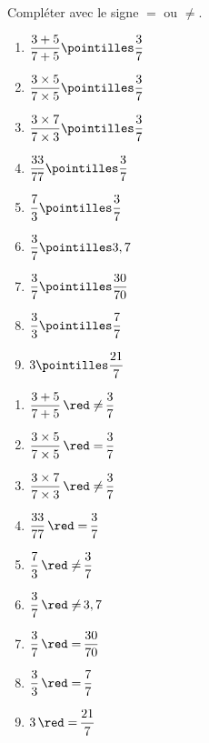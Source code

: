 \begin{exercice*}
   Compléter avec le signe $=$ ou $\neq$. \medskip
   \begin{multicols}{3}
      \begin{enumerate}
         \item $\dfrac{3+5}{7+5} \pointilles \dfrac{3}{7}$ \bigskip
         \item $\dfrac{3\times5}{7\times5} \pointilles \dfrac{3}{7}$ \bigskip
         \item $\dfrac{3\times7}{7\times3} \pointilles \dfrac{3}{7}$ \medskip
         \item $\dfrac{33}{77} \pointilles \dfrac{3}{7}$
         \item $\dfrac{7}{3} \pointilles \dfrac{3}{7}$
         \item $\dfrac{3}{7} \pointilles 3,7$
         \item $\dfrac{3}{7} \pointilles \dfrac{30}{70}$
         \item $\dfrac{3}{3} \pointilles \dfrac{7}{7}$
         \item $3 \pointilles \dfrac{21}{7}$
      \end{enumerate}
   \end{multicols}
\end{exercice*}

\begin{corrige}
   \begin{multicols}{3}
      \begin{enumerate}
         \item $\dfrac{3+5}{7+5} \, {\red \neq} \, \dfrac{3}{7}$ \medskip
         \item $\dfrac{3\times5}{7\times5} \, {\red =} \, \dfrac{3}{7}$ \medskip
         \item $\dfrac{3\times7}{7\times3} \, {\red \neq} \, \dfrac{3}{7}$ \medskip
         \item $\dfrac{33}{77} \, {\red =} \,  \dfrac{3}{7}$
         \item $\dfrac{7}{3} \, {\red \neq} \, \dfrac{3}{7}$
         \item $\dfrac{3}{7} \, {\red \neq} \, 3,7$
         \item $\dfrac{3}{7} \, {\red =} \, \dfrac{30}{70}$
         \item $\dfrac{3}{3} \, {\red =} \, \dfrac{7}{7}$
         \item $3 \, {\red =} \, \dfrac{21}{7}$
      \end{enumerate}
   \end{multicols}
\end{corrige}